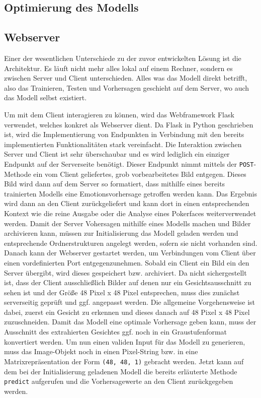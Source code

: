 \documentclass[12pt, a4paper]{scrbook}
\begin{document}
\subsection{Optimierung des Modells}

\subsection{Webserver}
Einer der wesentlichen Unterschiede zu der zuvor entwickelten Lösung ist die Architektur. Es läuft nicht mehr alles lokal auf einem Rechner, sondern es zwischen Server und Client unterschieden. Alles was das Modell direkt betrifft, also das Trainieren, Testen und Vorhersagen geschieht auf dem Server, wo auch das Modell selbst existiert. 


Um mit dem Client interagieren zu können, wird das Webframework Flask verwendet, welches konkret als Webserver dient. Da Flask in Python geschrieben ist, wird die Implementierung von Endpunkten in Verbindung mit den bereits implementierten Funktionalitäten stark vereinfacht.\newline
Die Interaktion zwischen Server und Client ist sehr überschaubar und es wird lediglich ein einziger Endpunkt auf der Serverseite benötigt. Dieser Endpunkt nimmt mittels der \texttt{POST}-Methode ein vom Client geliefertes, grob vorbearbeitetes Bild entgegen. Dieses Bild wird dann auf dem Server so formatiert, dass mithilfe eines bereits trainierten Modells eine Emotionsvorhersage getroffen werden kann. Das Ergebnis wird dann an den Client zurückgeliefert und kann dort in einen entsprechenden Kontext wie die reine Ausgabe oder die Analyse eines Pokerfaces weiterverwendet werden.\newline
Damit der Server Vohersagen mithilfe eines Modells machen und Bilder archivieren kann, müssen zur Initialisierung das Modell geladen werden und entsprechende Ordnerstrukturen angelegt werden, sofern sie nicht vorhanden sind. Danach kann der Webserver gestartet werden, um Verbindungen vom Client über einen vordefinierten Port entgegenzunehmen. Sobald ein Client ein Bild ein den Server übergibt, wird dieses gespeichert bzw. archiviert. Da nicht sichergestellt ist, dass der Client ausschließlich Bilder auf denen nur ein Gesichtsausschnitt zu sehen ist und der Größe  48 Pixel x 48 Pixel entsprechen, muss dies zunächst serverseitig geprüft und ggf. angepasst werden.  
Die allgemeine Vorgehensweise ist dabei, zuerst ein Gesicht zu erkennen und dieses danach auf 48 Pixel x 48 Pixel zuzuschneiden. Damit das Modell eine optimale Vorhersage geben kann, muss der Ausschnitt des extrahierten Gesichtes ggf. noch in ein Graustufenformat konvertiert werden. Um nun einen validen Input für das Modell zu generieren, muss das Image-Objekt noch in einen Pixel-String bzw. in eine Matrixrepräsentation der Form \texttt{(48, 48, 1)} gebracht werden. Jetzt kann auf dem bei der Initialisierung geladenen Modell die bereits erläuterte Methode \texttt{predict} aufgerufen und die Vorhersagewerte an den Client zurückgegeben werden.
\end{document}
